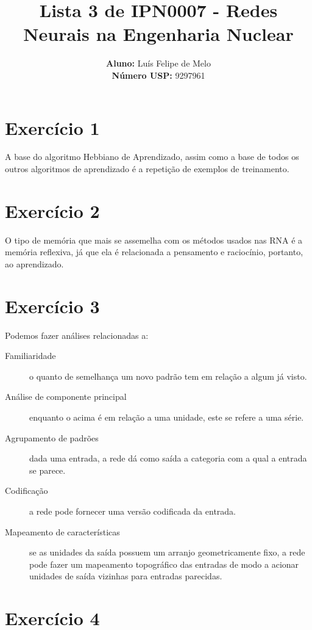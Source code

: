 \documentclass[a4]{article}
\title{\textbf{Lista 3 de IPN0007 - Redes Neurais na Engenharia Nuclear}}
\author{
    \textbf{Aluno:} Luís Felipe de Melo  \\
    \textbf{Número USP:} 9297961
    }
\date{}
\begin{document}
\maketitle

\begin{flushleft}

\section*{Exercício 1}

A base do algoritmo Hebbiano de Aprendizado, assim como a base de todos os outros algoritmos de aprendizado é a repetição de exemplos de treinamento.

\section*{Exercício 2}

O tipo de memória que mais se assemelha com os métodos usados nas RNA é a memória reflexiva, já que ela é relacionada a pensamento e raciocínio, portanto, ao aprendizado. 

\section*{Exercício 3}

Podemos fazer análises relacionadas a:

\begin{description}
	\item[Familiaridade] o quanto de semelhança um novo padrão tem em relação a algum já visto.
	\item[Análise de componente principal] enquanto o acima é em relação a uma unidade, este se refere a uma série.
	\item[Agrupamento de padrões] dada uma entrada, a rede dá como saída a categoria com a qual a entrada se parece.
	\item[Codificação] a rede pode fornecer uma versão codificada da entrada.
	\item[Mapeamento de características] se as unidades da saída possuem um arranjo geometricamente fixo, a rede pode fazer um mapeamento topográfico das entradas de modo a acionar unidades de saída vizinhas para entradas parecidas.
\end{description}

\section*{Exercício 4}


\end{flushleft}
\end{document}
